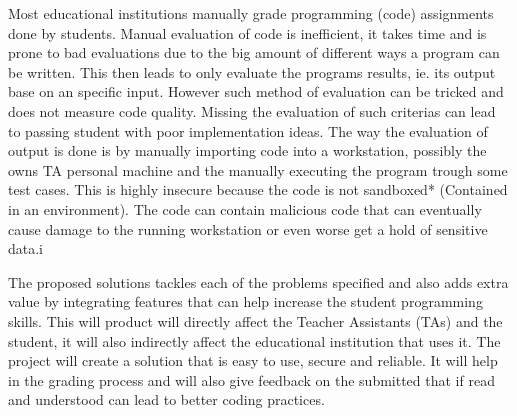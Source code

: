  Most educational institutions
manually grade programming (code) assignments done by students. Manual
evaluation of code is inefficient, it takes time and is prone to bad
evaluations due to the big amount of different ways a program can be written.
This then leads to only evaluate the programs results, ie. its output base on
an specific input. However such method of evaluation can be tricked and does
not measure code quality. Missing the evaluation of such criterias can lead to
passing student with poor implementation ideas. The way the evaluation of
output is done is by manually importing code into a workstation, possibly the
owns TA personal machine and the manually executing the program trough some
test cases. This is highly insecure because the code is not sandboxed*
(Contained in an environment). The code can contain malicious code that can
eventually cause damage to the running workstation or even worse get a hold of
sensitive data.i

The proposed solutions tackles each of the problems specified and also adds
extra value by integrating features that can help increase the student
programming skills. This will product will directly affect the Teacher
Assistants (TAs) and the student, it will also indirectly affect the
educational institution that uses it. The project will create a solution that
is easy to use, secure and reliable. It will help in the grading process and
will also give feedback on the submitted that if read and understood can lead
to better coding practices.
